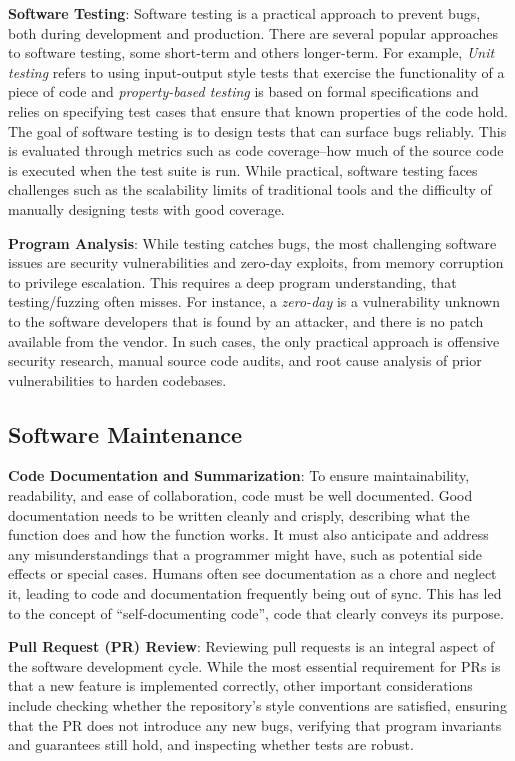 \textbf{Software Testing}: Software testing is a practical approach to prevent bugs, both during development and production. There are several popular approaches to software testing, some short-term and others longer-term. For example, \textit{Unit testing} refers to using input-output style tests that exercise the functionality of a piece of code and \textit{property-based testing} is based on formal specifications and relies on specifying test cases that ensure that known properties of the code hold. The goal of software testing is to design tests that can surface bugs reliably. This is evaluated through metrics such as code coverage--how much of the source code is executed when the test suite is run. While practical, software testing faces challenges such as the scalability limits of traditional tools and the difficulty of manually designing tests with good coverage. 

\textbf{Program Analysis}: While testing catches bugs, the most challenging software issues are security vulnerabilities and zero-day exploits, from memory corruption to privilege escalation. This requires a deep program understanding, that testing/fuzzing often misses. For instance, a \textit{zero-day} is a vulnerability unknown to the software developers that is found by an attacker, and there is no patch available from the vendor. In such cases, the only practical approach is offensive security research, manual source code audits, and root cause analysis of prior vulnerabilities to harden codebases.

\subsection{Software Maintenance}

\textbf{Code Documentation and Summarization}: To ensure maintainability, readability, and ease of collaboration, code must be well documented. Good documentation needs to be written cleanly and crisply, describing what the function does and how the function works. It must also anticipate and address any misunderstandings that a programmer might have, such as potential side effects or special cases. Humans often see documentation as a chore and neglect it, leading to code and documentation frequently being out of sync. This has led to the concept of ``self-documenting code'', code that clearly conveys its purpose. 

\textbf{Pull Request (PR) Review}: Reviewing pull requests is an integral aspect of the software development cycle. While the most essential requirement for PRs is that a new feature is implemented correctly, other important considerations include checking whether the repository's style conventions are satisfied, ensuring that the PR does not introduce any new bugs, verifying that program invariants and guarantees still hold, and inspecting whether tests are robust. 

